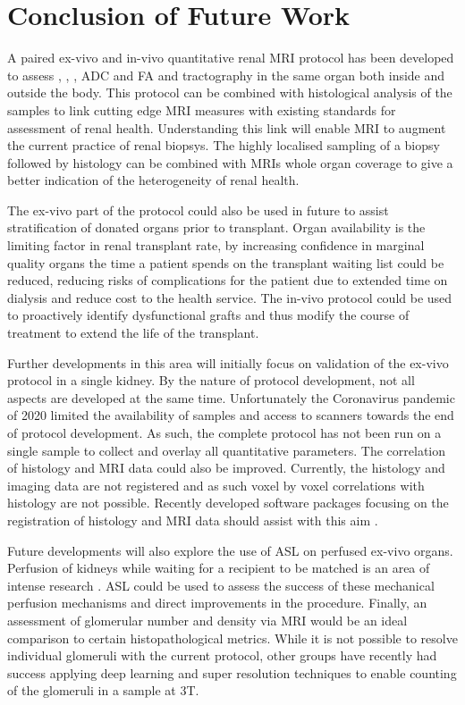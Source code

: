 \section{Conclusion of Future Work}
A paired ex-vivo and in-vivo quantitative renal \ac{MRI} protocol has been developed to assess \tone, \ttwo, \ttwostar, \ac{ADC} and \ac{FA} and tractography in the same organ both inside and outside the body. This protocol can be combined with histological analysis of the samples to link cutting edge \ac{MRI} measures with existing standards for assessment of renal health. Understanding this link will enable \ac{MRI} to augment the current practice of renal biopsys. The highly localised sampling of a biopsy followed by histology can be combined with \acp{MRI} whole organ coverage to give a better indication of the heterogeneity of renal health.

The ex-vivo part of the protocol could also be used in future to assist stratification of donated organs prior to transplant. Organ availability is the limiting factor in renal transplant rate, by increasing confidence in marginal quality organs the time a patient spends on the transplant waiting list could be reduced, reducing risks of complications for the patient due to extended time on dialysis and reduce cost to the health service. The in-vivo protocol could be used to proactively identify dysfunctional grafts and thus modify the course of treatment to extend the life of the transplant.

Further developments in this area will initially focus on validation of the ex-vivo protocol in a single kidney. By the nature of protocol development, not all aspects are developed at the same time. Unfortunately the Coronavirus pandemic of 2020 limited the availability of samples and access to scanners towards the end of protocol development. As such, the complete protocol has not been run on a single sample to collect and overlay all quantitative parameters. The correlation of histology and \ac{MRI} data could also be improved. Currently, the histology and imaging data are not registered and as such voxel by voxel correlations with histology are not possible. Recently developed software packages focusing on the registration of histology and \ac{MRI} data should assist with this aim \cite{huszar_tensor_2019}.

Future developments will also explore the use of \ac{ASL} on perfused ex-vivo organs. Perfusion of kidneys while waiting for a recipient to be matched is an area of intense research \cite{bellini_cold_2019,moers_value_2010,wight_pulsatile_2003}. \ac{ASL} could be used to assess the success of these mechanical perfusion mechanisms and direct improvements in the procedure. Finally, an assessment of glomerular number and density via \ac{MRI} would be an ideal comparison to certain histopathological metrics. While it is not possible to resolve individual glomeruli with the current protocol, other groups have recently had success applying deep learning and super resolution techniques to enable counting of the glomeruli in a sample at 3T.



